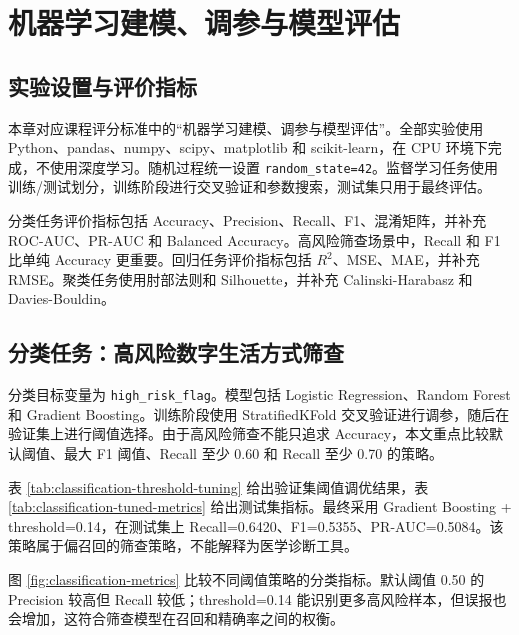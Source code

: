 \chapter{机器学习建模、调参与模型评估}

\section{实验设置与评价指标}

本章对应课程评分标准中的“机器学习建模、调参与模型评估”。全部实验使用 Python、pandas、numpy、scipy、matplotlib 和 scikit-learn，在 CPU 环境下完成，不使用深度学习。随机过程统一设置 \texttt{random\_state=42}。监督学习任务使用训练/测试划分，训练阶段进行交叉验证和参数搜索，测试集只用于最终评估。

分类任务评价指标包括 Accuracy、Precision、Recall、F1、混淆矩阵，并补充 ROC-AUC、PR-AUC 和 Balanced Accuracy。高风险筛查场景中，Recall 和 F1 比单纯 Accuracy 更重要。回归任务评价指标包括 $R^2$、MSE、MAE，并补充 RMSE。聚类任务使用肘部法则和 Silhouette，并补充 Calinski-Harabasz 和 Davies-Bouldin。

\section{分类任务：高风险数字生活方式筛查}

分类目标变量为 \texttt{high\_risk\_flag}。模型包括 Logistic Regression、Random Forest 和 Gradient Boosting。训练阶段使用 StratifiedKFold 交叉验证进行调参，随后在验证集上进行阈值选择。由于高风险筛查不能只追求 Accuracy，本文重点比较默认阈值、最大 F1 阈值、Recall 至少 0.60 和 Recall 至少 0.70 的策略。

表 \ref{tab:classification-threshold-tuning} 给出验证集阈值调优结果，表 \ref{tab:classification-tuned-metrics} 给出测试集指标。最终采用 Gradient Boosting + threshold=0.14，在测试集上 Recall=0.6420、F1=0.5355、PR-AUC=0.5084。该策略属于偏召回的筛查策略，不能解释为医学诊断工具。





图 \ref{fig:classification-metrics} 比较不同阈值策略的分类指标。默认阈值 0.50 的 Precision 较高但 Recall 较低；threshold=0.14 能识别更多高风险样本，但误报也会增加，这符合筛查模型在召回和精确率之间的权衡。



